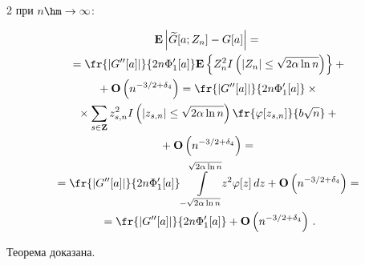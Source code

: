 \begin{multicols}{2}
   при $n\hm\to\infty$:


   


   \noindent


  \begin{multline*}


  \mathbf{E}\left|\widetilde{G}[a;Z_n]-G[a]\right|={}\\


  {}=\fr{|G''[a]|}{2n\Phi'_1 [a]}


   \mathbf{E}\left\{Z_n^2 I\left(|Z_n|\le \sqrt{2\alpha\ln n} \right)\right\}


   + {}\\


   {}+\mathbf{O}\left( {n^{- 3/2+\delta_4} } \right)=


   \fr{|G''[a]|}{2n\Phi'_1 [a]}\times{}\\


   {}\times


    \sum\limits_{s\in \mathbf{Z}}


   z_{s,n}^2 I\left(|z_{s,n}|\le \sqrt{2\alpha\ln n} \right)


   \fr{\varphi[z_{s,n}]}{b\sqrt{n}}


    + {}\\


    {}+\mathbf{O}\left( {n^{- 3/2+\delta_4} } \right)={}


  \\


{}=\fr{|G''[a]|}{2n\Phi'_1 [a]}


   \int\limits_{-\sqrt{2\alpha\ln n}}^{\sqrt{2\alpha\ln n}}\hspace*{-1mm}


   z^2 \varphi[z]\, dz


   + \mathbf{O}\left( {n^{- 3/2+\delta_4} } \right)


  ={}\\


  {}=\fr{|G''[a]|}{2n\Phi'_1 [a]}


    +\mathbf{O}\left( {n^{- 3/2+\delta_4} } \right)\,.


  \end{multline*}





   Теорема доказана.


   


   \vspace*{-9pt}






\end{multicols}
